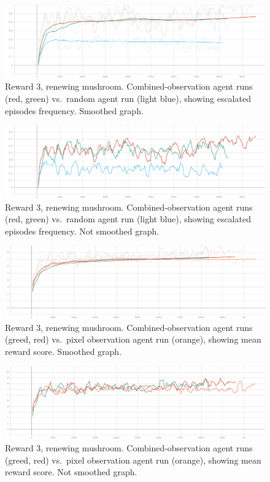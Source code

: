 \documentclass[]{article}
\begin{document}
\begin{figure}
\centering
\includegraphics{./img/114087180-d67cc080-98b3-11eb-84e5-29246fdaff00.png}
\caption{Reward 3, renewing mushroom. Combined-observation agent runs
(red, green) vs.~random agent run (light blue), showing escalated
episodes frequency. Smoothed graph.}
\end{figure}

\begin{figure}
\centering
\includegraphics{./img/114087274-f8764300-98b3-11eb-8c0a-6a45d264176d.png}
\caption{Reward 3, renewing mushroom. Combined-observation agent runs
(red, green) vs.~random agent run (light blue), showing escalated
episodes frequency. Not smoothed graph.}
\end{figure}

\begin{figure}
\centering
\includegraphics{./img/114088707-94ed1500-98b5-11eb-828d-5b2b6e865df1.png}
\caption{Reward 3, renewing mushroom. Combined-observation agent runs
(greed, red) vs.~pixel observation agent run (orange), showing mean
reward score. Smoothed graph.}
\end{figure}

\begin{figure}
\centering
\includegraphics{./img/114088887-ce258500-98b5-11eb-9f24-b3dba2022036.png}
\caption{Reward 3, renewing mushroom. Combined-observation agent runs
(greed, red) vs.~pixel observation agent run (orange), showing mean
reward score. Not smoothed graph.}
\end{figure}
\end{document}
